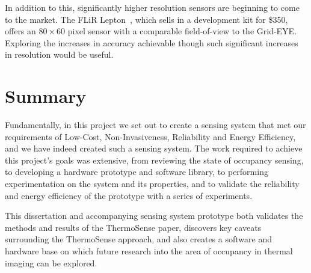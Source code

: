 \documentclass[../thesis/thesis.tex]{subfiles}
\begin{document}
In addition to this, significantly higher resolution sensors are beginning to come to the market. The FLiR Lepton~\cite{flir}, which sells in a development kit for \$350, offers an $80 \times 60$ pixel sensor with a comparable field-of-view to the Grid-EYE. Exploring the increases in accuracy achievable though such significant increases in resolution would be useful.

\section{Summary}
Fundamentally, in this project we set out to create a sensing system that met our requirements of Low-Cost, Non-Invasiveness, Reliability and Energy Efficiency, and we have indeed created such a sensing system. The work required to achieve this project's goals was extensive, from reviewing the state of occupancy sensing, to developing a hardware prototype and software library, to performing experimentation on the system and its properties, and to validate the reliability and energy efficiency of the prototype with a series of experiments.

This dissertation and accompanying sensing system prototype both validates the methods and results of the ThermoSense paper, discovers key caveats surrounding the ThermoSense approach, and also creates a software and hardware base on which future research into the area of occupancy in thermal imaging can be explored.
 
\end{document}
